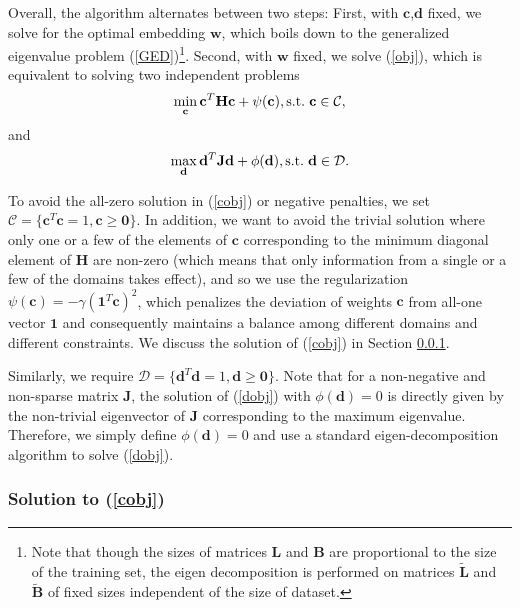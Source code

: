 \documentclass[10pt,twocolumn,letterpaper]{article}
\begin{document}
Overall, the algorithm alternates between two steps: First, with $\mathbf{c}$,$\mathbf{d}$ fixed, we solve for the optimal embedding $\mathbf{w}$, which boils down to the generalized eigenvalue problem (\ref{GED})\footnote{Note that though the sizes of matrices $\mathbf{L}$ and $\mathbf{B}$ are proportional to the size of the training set, the eigen decomposition is performed on matrices $\tilde{\mathbf{L}}$ and $\tilde{\mathbf{B}}$ of fixed sizes independent of the size of dataset.}. Second, with $\mathbf{w}$ fixed, we solve (\ref{obj}), which is equivalent to solving two independent problems
\begin{equation}
\label{cobj}
\min_{\mathbf{c}}\mathbf{c}^{T}\mathbf{H}\mathbf{c}+\psi(\mathbf{c}), \textup{s.t.}\hspace{3pt}\mathbf{c}\in\mathcal{C},
\end{equation}
and
\begin{equation}
\label{dobj}
\max_{\mathbf{d}}\mathbf{d}^{T}\mathbf{J}\mathbf{d}+\phi(\mathbf{d}), \textup{s.t.}\hspace{3pt}\mathbf{d}\in\mathcal{D}.
\end{equation}

To avoid the all-zero solution in (\ref{cobj}) or negative penalties, we set $\mathcal{C}=\{\mathbf{c}^{T}\mathbf{c}=1, \mathbf{c}\ge\mathbf{0}\}$. In addition, we want to avoid the trivial solution where only one or a few of the elements of $\mathbf{c}$ corresponding to the minimum diagonal element of $\mathbf{H}$ are non-zero (which means that only information from a single or a few of the domains takes effect), and so we use the regularization $\psi(\mathbf{c})=-\gamma(\mathbf{1}^{T}\mathbf{c})^2$, which penalizes the deviation of weights $\mathbf{c}$ from all-one vector $\mathbf{1}$ and consequently maintains a balance among different domains and different constraints. We discuss the solution of (\ref{cobj}) in Section \ref{solc}.

Similarly, we require $\mathcal{D}=\{\mathbf{d}^{T}\mathbf{d}=1, \mathbf{d}\ge\mathbf{0}\}$. Note that for a non-negative and non-sparse matrix $\mathbf{J}$, the solution of (\ref{dobj}) with $\phi(\mathbf{d})=0$ is directly given by the non-trivial eigenvector of $\mathbf{J}$ corresponding to the maximum eigenvalue. Therefore, we simply define $\phi(\mathbf{d})=0$ and use a standard eigen-decomposition algorithm to solve (\ref{dobj}).


\subsubsection{Solution to (\ref{cobj})}
\label{solc}
\end{document}
